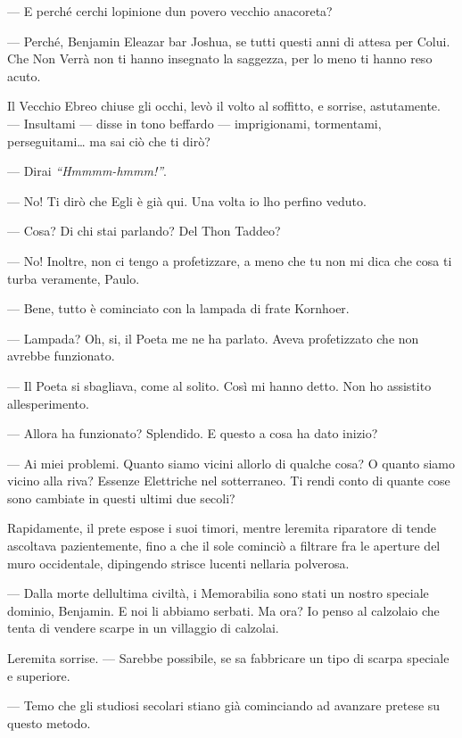 --- E perché cerchi l\textquotesingle opinione d\textquotesingle un
povero vecchio anacoreta?

--- Perché, Benjamin Eleazar bar Joshua, se tutti questi anni di attesa
per Colui. Che Non Verrà non ti hanno insegnato la saggezza, per lo meno
ti hanno reso acuto.

Il Vecchio Ebreo chiuse gli occhi, levò il volto al soffitto, e sorrise,
astutamente. --- Insultami --- disse in tono beffardo --- imprigionami,
tormentami, perseguitami\ldots{} ma sai ciò che ti dirò?

--- Dirai \emph{``Hmmmm-hmmm!''}.

--- No! Ti dirò che Egli è già qui. Una volta io l\textquotesingle ho
perfino veduto.

--- Cosa? Di chi stai parlando? Del Thon Taddeo?

--- No! Inoltre, non ci tengo a profetizzare, a meno che tu non mi dica
che cosa ti turba veramente, Paulo.

--- Bene, tutto è cominciato con la lampada di frate Kornhoer.

--- Lampada? Oh, si, il Poeta me ne ha parlato. Aveva profetizzato che
non avrebbe funzionato.

--- Il Poeta si sbagliava, come al solito. Così mi hanno detto. Non ho
assistito all\textquotesingle esperimento.

--- Allora ha funzionato? Splendido. E questo a cosa ha dato inizio?

--- Ai miei problemi. Quanto siamo vicini all\textquotesingle orlo di
qualche cosa? O quanto siamo vicino alla riva? Essenze Elettriche nel
sotterraneo. Ti rendi conto di quante cose sono cambiate in questi
ultimi due secoli?

Rapidamente, il prete espose i suoi timori, mentre
l\textquotesingle eremita riparatore di tende ascoltava pazientemente,
fino a che il sole cominciò a filtrare fra le aperture del muro
occidentale, dipingendo strisce lucenti nell\textquotesingle aria
polverosa.

--- Dalla morte dell\textquotesingle ultima civiltà, i Memorabilia sono
stati un nostro speciale dominio, Benjamin. E noi li abbiamo serbati. Ma
ora? Io penso al calzolaio che tenta di vendere scarpe in un villaggio
di calzolai.

L\textquotesingle eremita sorrise. --- Sarebbe possibile, se sa
fabbricare un tipo di scarpa speciale e superiore.

--- Temo che gli studiosi secolari stiano già cominciando ad avanzare
pretese su questo metodo.

